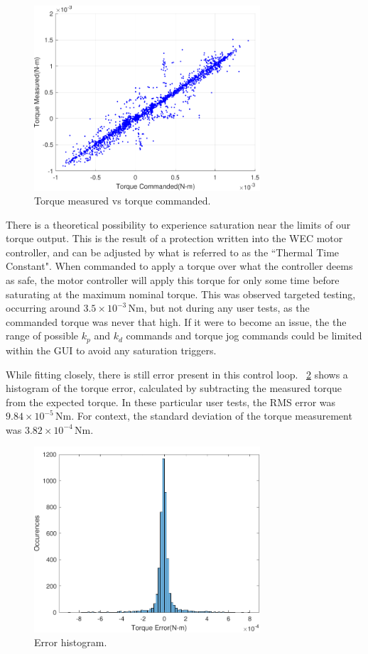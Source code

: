 \documentclass[11pt, letterpaper]{article}
\begin{document}
\begin{figure}[tb]
  \centering
  \includegraphics[width=0.75\textwidth]{diagrams/TorqueCommanded.pdf}
  \caption{Torque measured vs torque commanded.}
  \label{fig:TorqueCommanded}
\end{figure}

There is a theoretical possibility to experience saturation near the limits of our torque output.
This is the result of a protection written into the WEC motor controller, and can be adjusted by what is referred to as the ``Thermal Time Constant".
When commanded to apply a torque over what the controller deems as safe, the motor controller will apply this torque for only some time before saturating at the maximum nominal torque.
This was observed targeted testing, occurring around $3.5\times 10^{-3}$\,Nm, but not during any user tests, as the commanded torque was never that high.
If it were to become an issue, the the range of possible $k_p$ and $k_d$ commands and torque jog commands could be limited within the GUI to avoid any saturation triggers.

While fitting closely, there is still error present in this control loop. 
\figurename~\ref{fig:ErrorHistogram} shows a histogram of the torque error, calculated by subtracting the measured torque from the expected torque.
In these particular user tests, the RMS error was $9.84 \times 10^{-5}$\,Nm.
For context, the standard deviation of the torque measurement was $3.82\times 10^{-4}$\,Nm.

\begin{figure}[tb]
  \centering
  \includegraphics[width=0.75\textwidth]{diagrams/ErrorHistogram.pdf}
  \caption{Error histogram.}
  \label{fig:ErrorHistogram}
\end{figure}
\end{document}
